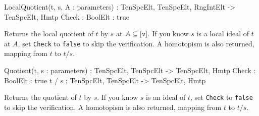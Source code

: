 \begin{intrinsics}
LocalQuotient(t, s, A : parameters) : TenSpcElt, TenSpcElt, {RngIntElt} -> TenSpcElt, Hmtp
    Check : BoolElt : true
\end{intrinsics}

Returns the local quotient of $t$ by $s$ at $A\subseteq[\operatorname{\mathtt{v}}]$. If you know $s$ is a local 
ideal of $t$ at $A$, set {\tt Check} to {\tt false} to skip the verification.
A homotopism is also returned, mapping from $t$ to $t/s$.

\begin{intrinsics}
Quotient(t, s : parameters) : TenSpcElt, TenSpcElt -> TenSpcElt, Hmtp
    Check : BoolElt : true
t / s : TenSpcElt, TenSpcElt -> TenSpcElt, Hmtp
\end{intrinsics}

Returns the quotient of $t$ by $s$. If you know $s$ is an ideal of $t$, 
set {\tt Check} to {\tt false} to skip the verification.
A homotopism is also returned, mapping from $t$ to $t/s$.

